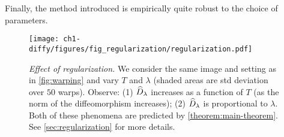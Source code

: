 Finally, the method introduced is empirically quite robust to the choice of parameters.





\begin{figure}[t]
    \centering
    \texttt{[image: ch1-diffy/figures/fig\_regularization/regularization.pdf]}
    \caption{\emph{Effect of regularization.} We consider the same image and setting as in \cref{fig:warping} and vary $T$ and $\lambda$ (shaded areas are std deviation over $50$ warps). Observe: (1) $\widehat D_\lambda$ increases as a function of $T$ (as the norm of the diffeomorphism increases); (2) $\widehat D_\lambda$ is  proportional to $\lambda$. Both of these phenomena are predicted by \cref{theorem:main-theorem}. See \cref{sec:regularization} for more details.}
    \label{fig:regularization}
\end{figure}






